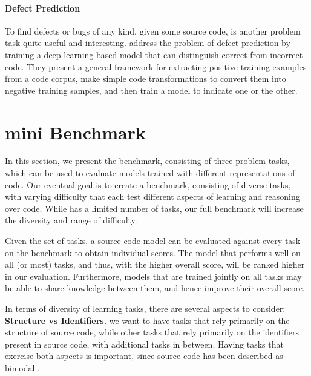 \documentclass[sigplan,review,anonymous]{acmart}\settopmatter{printfolios=true,printccs=false,printacmref=false}
\begin{document}
\paragraph*{Defect Prediction} To find defects or bugs of any kind, given some source code, is another problem task quite useful and interesting. \citet{pradel2017deep} address the problem of defect prediction by training a deep-learning based model that can distinguish correct from incorrect code. They present a general framework for extracting positive training examples from a code corpus, make simple code transformations to convert them into negative training samples, and then train a model to indicate one or the other.


\section{\benchmarkName mini Benchmark}
\label{sec:glucode mini}
In this section, we present the \minibenchmarkName benchmark, consisting of three problem tasks, which can be used to evaluate models trained with different representations of code. Our eventual goal is to create a benchmark, consisting of diverse tasks, with varying difficulty that each test different aspects of learning and reasoning over code. While \minibenchmarkName has a limited number of tasks, our full benchmark will increase the diversity and range of difficulty.

Given the set of tasks, a source code model can be evaluated against every task on the benchmark to obtain individual scores. The model that performs well on all (or most) tasks, and thus, with the higher overall score, will be ranked higher in our evaluation. Furthermore, models that are trained jointly on all tasks may be able to share knowledge between them, and hence improve their overall score.\newline


In terms of diversity of learning tasks, there are several aspects to consider: 
\textbf{Structure vs Identifiers.} we want to have tasks that rely primarily on the structure of source code, while other tasks that rely primarily on the identifiers present in source code, with additional tasks in between. Having tasks that exercise both aspects is important, since source code has been described as bimodal \cite{allamanis2015bimodal}. 
\end{document}
